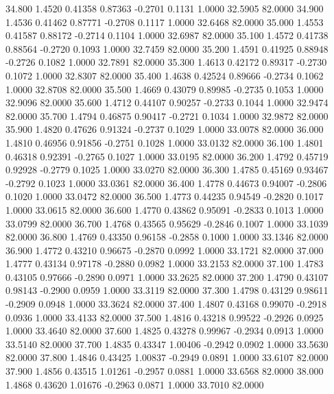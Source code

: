   34.800   1.4520   0.41358   0.87363  -0.2701   0.1131   1.0000  32.5905  82.0000
  34.900   1.4536   0.41462   0.87771  -0.2708   0.1117   1.0000  32.6468  82.0000
  35.000   1.4553   0.41587   0.88172  -0.2714   0.1104   1.0000  32.6987  82.0000
  35.100   1.4572   0.41738   0.88564  -0.2720   0.1093   1.0000  32.7459  82.0000
  35.200   1.4591   0.41925   0.88948  -0.2726   0.1082   1.0000  32.7891  82.0000
  35.300   1.4613   0.42172   0.89317  -0.2730   0.1072   1.0000  32.8307  82.0000
  35.400   1.4638   0.42524   0.89666  -0.2734   0.1062   1.0000  32.8708  82.0000
  35.500   1.4669   0.43079   0.89985  -0.2735   0.1053   1.0000  32.9096  82.0000
  35.600   1.4712   0.44107   0.90257  -0.2733   0.1044   1.0000  32.9474  82.0000
  35.700   1.4794   0.46875   0.90417  -0.2721   0.1034   1.0000  32.9872  82.0000
  35.900   1.4820   0.47626   0.91324  -0.2737   0.1029   1.0000  33.0078  82.0000
  36.000   1.4810   0.46956   0.91856  -0.2751   0.1028   1.0000  33.0132  82.0000
  36.100   1.4801   0.46318   0.92391  -0.2765   0.1027   1.0000  33.0195  82.0000
  36.200   1.4792   0.45719   0.92928  -0.2779   0.1025   1.0000  33.0270  82.0000
  36.300   1.4785   0.45169   0.93467  -0.2792   0.1023   1.0000  33.0361  82.0000
  36.400   1.4778   0.44673   0.94007  -0.2806   0.1020   1.0000  33.0472  82.0000
  36.500   1.4773   0.44235   0.94549  -0.2820   0.1017   1.0000  33.0615  82.0000
  36.600   1.4770   0.43862   0.95091  -0.2833   0.1013   1.0000  33.0799  82.0000
  36.700   1.4768   0.43565   0.95629  -0.2846   0.1007   1.0000  33.1039  82.0000
  36.800   1.4769   0.43350   0.96158  -0.2858   0.1000   1.0000  33.1346  82.0000
  36.900   1.4772   0.43210   0.96675  -0.2870   0.0992   1.0000  33.1721  82.0000
  37.000   1.4777   0.43134   0.97178  -0.2880   0.0982   1.0000  33.2153  82.0000
  37.100   1.4783   0.43105   0.97666  -0.2890   0.0971   1.0000  33.2625  82.0000
  37.200   1.4790   0.43107   0.98143  -0.2900   0.0959   1.0000  33.3119  82.0000
  37.300   1.4798   0.43129   0.98611  -0.2909   0.0948   1.0000  33.3624  82.0000
  37.400   1.4807   0.43168   0.99070  -0.2918   0.0936   1.0000  33.4133  82.0000
  37.500   1.4816   0.43218   0.99522  -0.2926   0.0925   1.0000  33.4640  82.0000
  37.600   1.4825   0.43278   0.99967  -0.2934   0.0913   1.0000  33.5140  82.0000
  37.700   1.4835   0.43347   1.00406  -0.2942   0.0902   1.0000  33.5630  82.0000
  37.800   1.4846   0.43425   1.00837  -0.2949   0.0891   1.0000  33.6107  82.0000
  37.900   1.4856   0.43515   1.01261  -0.2957   0.0881   1.0000  33.6568  82.0000
  38.000   1.4868   0.43620   1.01676  -0.2963   0.0871   1.0000  33.7010  82.0000
